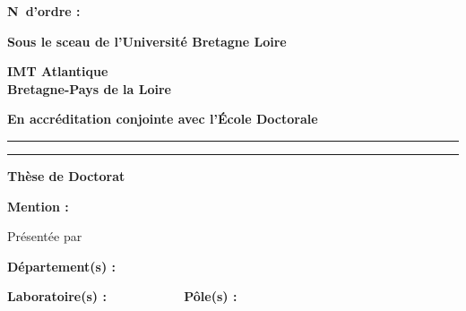 
    \textbf{N\degree~d'ordre :} 
    \vfill
    
    \begin{center}
        \Large{\textbf{Sous le sceau de l'Université Bretagne Loire}}
    \end{center}
    \begin{center}
        \huge{\textbf{IMT Atlantique\\Bretagne-Pays de la Loire}}
    \end{center}
    \begin{center}
        \Large{\textbf{En accréditation conjointe avec l'École Doctorale }}
    \end{center}
    \vfill
    
    \rule{\textwidth}{1pt}
    \begin{center}
        \huge{\textbf{\textsc{}}}
    \end{center}
    \rule{\textwidth}{1pt}
    \vfill
    
    \begin{center}
        \Large{\textbf{Thèse de Doctorat}}
    \end{center}
    \begin{center}
        \textbf{Mention :} 
    \end{center}
    \vfill
    
    \begin{center}
        Présentée par \textbf{}
    \end{center}
    \begin{center}
        \textbf{Département(s) :} 
    \end{center}
    \begin{center}
        \textbf{Laboratoire(s) :}  ~~~~~~~~~~~ \textbf{Pôle(s) :} 
    \end{center}
    \vfill
    
